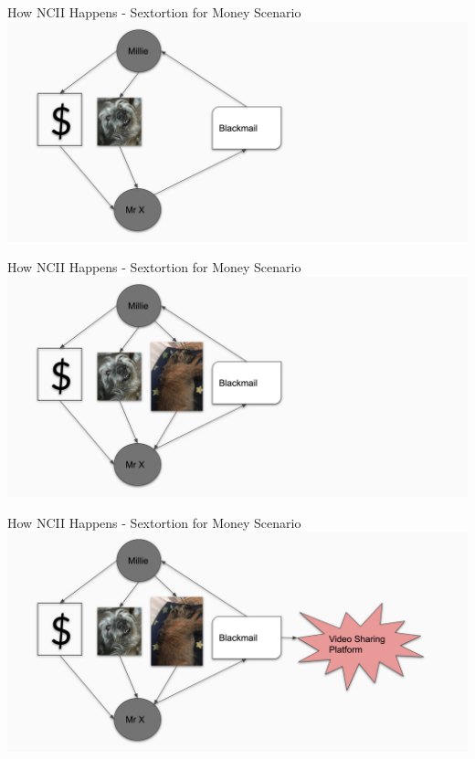 \documentclass[nobackground,dvipsnames,table,aspectratio=169]{beamer}
\begin{document}
\begin{frame}{How NCII Happens - Sextortion for Money Scenario}
    \includegraphics[width=\textwidth]{sextortion-money-ncii-diagram-3}
\end{frame}

\begin{frame}{How NCII Happens - Sextortion for Money Scenario}
    \includegraphics[width=\textwidth]{sextortion-money-ncii-diagram-4}
\end{frame}

\begin{frame}{How NCII Happens - Sextortion for Money Scenario}
    \includegraphics[width=\textwidth]{sextortion-money-ncii-diagram-5}
\end{frame}
\end{document}
